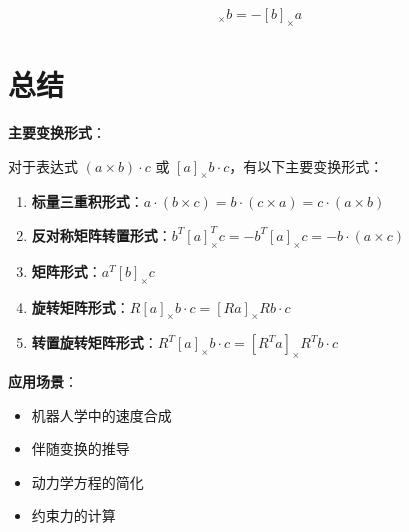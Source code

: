 \documentclass[12pt,a4paper]{article}
\begin{document}
\begin{equation}
[a]_{\times} b = -[b]_{\times} a
\end{equation}

\section{总结}

\textbf{主要变换形式}：

对于表达式 $(a \times b) \cdot c$ 或 $[a]_{\times} b \cdot c$，有以下主要变换形式：

\begin{enumerate}
\item \textbf{标量三重积形式}：$a \cdot (b \times c) = b \cdot (c \times a) = c \cdot (a \times b)$
\item \textbf{反对称矩阵转置形式}：$b^T [a]_{\times}^T c = -b^T [a]_{\times} c = -b \cdot (a \times c)$
\item \textbf{矩阵形式}：$a^T [b]_{\times} c$
\item \textbf{旋转矩阵形式}：$R [a]_{\times} b \cdot c = [Ra]_{\times} R b \cdot c$
\item \textbf{转置旋转矩阵形式}：$R^T [a]_{\times} b \cdot c = [R^T a]_{\times} R^T b \cdot c$
\end{enumerate}

\textbf{应用场景}：
\begin{itemize}
\item 机器人学中的速度合成
\item 伴随变换的推导
\item 动力学方程的简化
\item 约束力的计算
\end{itemize}
\end{document}

